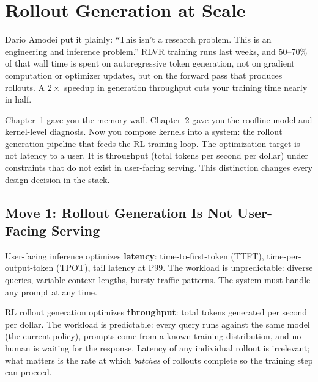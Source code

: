 \section*{Rollout Generation at Scale}

\smallskip

\begin{whythis}
Dario Amodei put it plainly: ``This isn't a research problem. This is an engineering and inference problem.'' RLVR training runs last weeks, and 50--70\% of that wall time is spent on autoregressive token generation, not on gradient computation or optimizer updates, but on the forward pass that produces rollouts. A $2\times$ speedup in generation throughput cuts your training time nearly in half.

Chapter~1 gave you the memory wall. Chapter~2 gave you the roofline model and kernel-level diagnosis. Now you compose kernels into a system: the rollout generation pipeline that feeds the RL training loop. The optimization target is not latency to a user. It is throughput (total tokens per second per dollar) under constraints that do not exist in user-facing serving. This distinction changes every design decision in the stack.
\end{whythis}

\subsection*{Move 1: Rollout Generation Is Not User-Facing Serving}

User-facing inference optimizes \textbf{latency}: time-to-first-token (TTFT), time-per-output-token (TPOT), tail latency at P99. The workload is unpredictable: diverse queries, variable context lengths, bursty traffic patterns. The system must handle any prompt at any time.

RL rollout generation optimizes \textbf{throughput}: total tokens generated per second per dollar. The workload is predictable: every query runs against the same model (the current policy), prompts come from a known training distribution, and no human is waiting for the response. Latency of any individual rollout is irrelevant; what matters is the rate at which \textit{batches} of rollouts complete so the training step can proceed.

